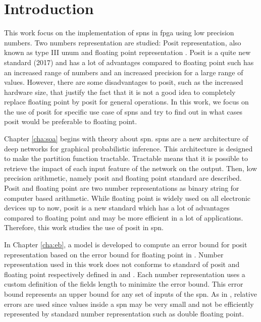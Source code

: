 
\chapter{Introduction}
\label{cha:intro}

This work focus on the implementation of \glspl{spn} in \gls{fpga} using low precision numbers. Two numbers representation are studied: Posit representation, also known as type III \gls{unum} \cite{posit_std} and floating point representation \cite{float_std}. Posit is a quite new standard (2017) and has a lot of advantages compared to floating point such has an increased range of numbers and an increased precision for a large range of values. However, there are some disadvantages to posit, such as the increased hardware size, that justify the fact that it is not a good idea to completely replace floating point by posit for general operations. In this work, we focus on the use of posit for specific use case of \glspl{spn} and try to find out in what cases posit would be preferable to floating point.

Chapter \ref{cha:soa} begins with theory about \gls{spn}. \Glspl{spn} are a new architecture \cite{spns} of deep networks for graphical probabilistic inference. This architecture is designed to make the partition function tractable. Tractable means that it is possible to retrieve the impact of each input feature of the network on the output. Then, low precision arithmetic, namely posit \cite{posit_std} and floating point \cite{float_std} standard are described. Posit and floating point are two number representations as binary string for computer based arithmetic. While floating point is widely used on all electronic devices up to now, posit is a new standard which has a lot of advantages compared to floating point and may be more efficient in a lot of applications. Therefore, this work studies the use of posit in \gls{spn}.

In Chapter \ref{cha:eb}, a model is developed to compute an error bound for posit representation based on the error bound for floating point in \cite{errorbound_float}. Number representation used in this work does not conforms to standard of posit and floating point respectively defined in \cite{posit_std} and \cite{float_std}. Each number representation uses a custom definition of the fields length to minimize the error bound. This error bound represents an upper bound for any set of inputs of the \gls{spn}. As in \cite{errorbound_float}, relative errors are used since values inside a \gls{spn} may be very small and not be efficiently represented by standard number representation such as double floating point.


